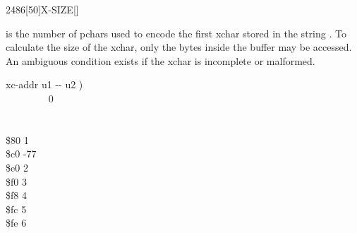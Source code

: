 \begin{worddef}{2486}[50]{X-SIZE}[]%
\item {}

	 is the number of pchars used to encode the first xchar
	stored in the string .  To calculate the size of
	the xchar, only the bytes inside the buffer may be accessed.  An
	ambiguous condition exists if the xchar is incomplete or malformed.

	\begin{implement} %
	\word{:}   xc-addr u1 -{}- u2 ) \\
	\tab {} ~~~~~~~~  0   \\
	\tab {}  \\
	\tab {} \\
	\tab {} \$80    1   \\
	\tab {} \$c0   -77  ~~ \\
	\tab {} \$e0    2   \\
	\tab {} \$f0    3   \\
	\tab {} \$f8    4   \\
	\tab {} \$fc    5   \\
	\tab {} \$fe    6   \\
	  \word{;}
	\end{implement}
\end{worddef}



